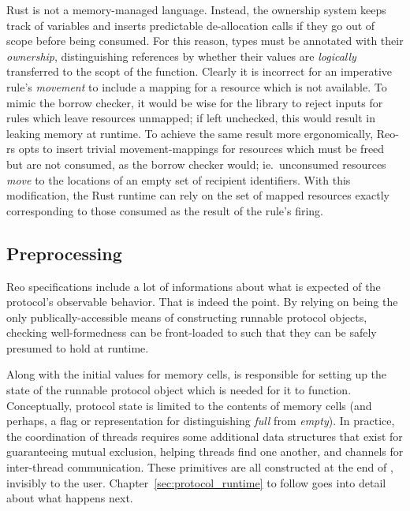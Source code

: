 Rust is not a memory-managed language. Instead, the ownership system keeps track of variables and inserts predictable de-allocation calls if they go out of scope before being consumed. For this reason, types must be annotated with their \textit{ownership}, distinguishing references by whether their values are \textit{logically} transferred to the scopt of the function. Clearly it is incorrect for an imperative rule's \textit{movement} to include a mapping for a resource which is not available. 
To mimic the borrow checker, it would be wise for the library to reject inputs for rules which leave resources unmapped; if left unchecked, this would result in leaking memory at runtime. To achieve the same result more ergonomically, Reo-rs opts to insert trivial movement-mappings for resources which must be freed but are not consumed, as the borrow checker would; ie.\ unconsumed resources \textit{move} to the locations of an empty set of recipient identifiers. With this modification, the Rust runtime can rely on the set of mapped resources exactly corresponding to those consumed as the result of the rule's firing. 

\subsection{Preprocessing}
Reo specifications include a lot of informations about what is expected of the protocol's observable behavior. That is indeed the point. By relying on  being the only publically-accessible means of constructing runnable protocol objects, checking well-formedness can be front-loaded to  such that they can be safely presumed to hold at runtime. 

Along with the initial values for memory cells,  is responsible for setting up the state of the runnable protocol object which is needed for it to function. Conceptually, protocol state is limited to the contents of memory cells (and perhaps, a flag or  representation for distinguishing \textit{full} from \textit{empty}). In practice, the coordination of threads requires some additional data structures that exist for guaranteeing mutual exclusion, helping threads find one another, and channels for inter-thread communication. These primitives are all constructed at the end of , invisibly to the user. Chapter~\ref{sec:protocol_runtime} to follow goes into detail about what happens next.
